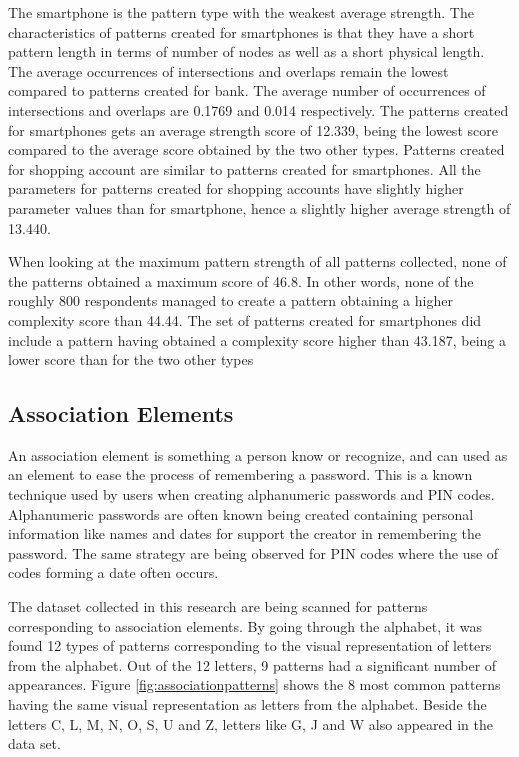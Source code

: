   The smartphone is the pattern type with the weakest average strength. The characteristics of patterns created for smartphones is that they have a short pattern length in terms of number of nodes as well as a short physical length. The average occurrences of intersections and overlaps remain the lowest compared to patterns created for bank. The average number of occurrences of intersections and overlaps are 0.1769 and 0.014 respectively. The patterns created for smartphones gets an average strength score of 12.339, being the lowest score compared to the average score obtained by the two other types. Patterns created for shopping account are similar to patterns created for smartphones. All the parameters for patterns created for shopping accounts have slightly higher parameter values than for smartphone, hence a slightly higher average strength of 13.440.

  When looking at the maximum pattern strength of all patterns collected, none of the patterns obtained a maximum score of 46.8. In other words, none of the roughly 800 respondents managed to create a pattern obtaining a higher complexity score than 44.44. The set of patterns created for smartphones did include a pattern having obtained a  complexity score higher than 43.187, being a lower score than for the two other types

  \subsection{Association Elements} \label{sec:associationelements}
  An association element is something a person know or recognize, and can used as an element to ease the process of remembering a password. This is a known technique used by users when creating alphanumeric passwords and PIN codes. Alphanumeric passwords are often known being created containing personal information like names and dates for support the creator in remembering the password. The same strategy are being observed for PIN codes where the use of codes forming a date often occurs. 

  The dataset collected in this research are being scanned for patterns corresponding to association elements. By going through the alphabet, it was found 12 types of patterns corresponding to the visual representation of letters from the alphabet. Out of the 12 letters, 9 patterns had a significant number of appearances. Figure \ref{fig:associationpatterns} shows the 8 most common patterns having the same visual representation as letters from the alphabet. Beside the letters C, L, M, N, O, S, U and Z, letters like G, J and W also appeared in the data set.

